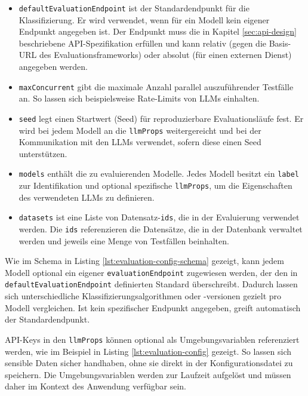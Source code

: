 \begin{itemize}
    \item \texttt{defaultEvaluationEndpoint} ist der Standardendpunkt für die Klassifizierung. Er wird verwendet, wenn für ein Modell kein eigener Endpunkt angegeben ist. Der Endpunkt muss die in Kapitel \ref{sec:api-design} beschriebene API-Spezifikation erfüllen und kann relativ (gegen die Basis-URL des Evaluationsframeworks) oder absolut (für einen externen Dienst) angegeben werden.
    \item \texttt{maxConcurrent} gibt die maximale Anzahl parallel auszuführender Testfälle an. So lassen sich beispielsweise Rate-Limits von \acp{LLM} einhalten.
    \item \texttt{seed} legt einen Startwert (Seed) für reproduzierbare Evaluationsläufe fest. Er wird bei jedem Modell an die \texttt{llmProps} weitergereicht und bei der Kommunikation mit den \acp{LLM} verwendet, sofern diese einen Seed unterstützen.
    \item \texttt{models} enthält die zu evaluierenden Modelle. Jedes Modell besitzt ein \texttt{label} zur Identifikation und optional spezifische \texttt{llmProps}, um die Eigenschaften des verwendeten \acp{LLM} zu definieren.
    \item \texttt{datasets} ist eine Liste von Datensatz-\texttt{ids}, die in der Evaluierung verwendet werden. Die \texttt{ids} referenzieren die Datensätze, die in der Datenbank verwaltet werden und jeweils eine Menge von Testfällen beinhalten.
\end{itemize}

Wie im Schema in Listing \ref{lst:evaluation-config-schema} gezeigt, kann jedem Modell optional ein eigener \texttt{evaluationEndpoint} zugewiesen werden, der den in \texttt{defaultEvaluationEndpoint} definierten Standard überschreibt. Dadurch lassen sich unterschiedliche Klassifizierungsalgorithmen oder -versionen gezielt pro Modell vergleichen. Ist kein spezifischer Endpunkt angegeben, greift automatisch der Standardendpunkt.

API-Keys in den \texttt{llmProps} können optional als Umgebungsvariablen referenziert werden, wie im Beispiel in Listing \ref{lst:evaluation-config} gezeigt. So lassen sich sensible Daten sicher handhaben, ohne sie direkt in der Konfigurationsdatei zu speichern. Die Umgebungsvariablen werden zur Laufzeit aufgelöst und müssen daher im Kontext des Anwendung verfügbar sein.